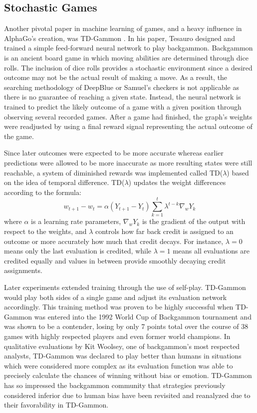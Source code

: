 

\subsection{Stochastic Games}


Another pivotal paper in machine learning of games,
and a heavy influence in AlphaGo's creation,
was TD-Gammon
\cite{tdgammon}.
%
In his paper,
Tesauro designed and trained a simple feed-forward neural network to play 
backgammon.
%
Backgammon is an ancient board game in which moving abilities are determined
through dice rolls.
%
The inclusion of dice rolls provides a stochastic environment since
a desired outcome may not be the actual result of making a move.
%
As a result,
the searching methodology of DeepBlue or Samuel's checkers is not applicable
as there is no guarantee of reaching a given state.
%
Instead,
the neural network is trained to predict the likely outcome of a game with a
given position
through observing several recorded games.
%
After a game had finished,
the graph's weights were readjusted by using a final reward signal representing
the actual outcome of the game.

Since later outcomes were expected to be more accurate whereas earlier
predictions were allowed to be more inaccurate as more resulting states were
still reachable,
a system of diminished rewards was implemented called
TD($\lambda$) based on the idea of temporal difference.
%
TD($\lambda$) updates the weight differences according to the formula:
\[
	w_{t+1} - w_t =
		\alpha (Y_{t+1}-Y_t)
		\sum_{k=1}^t {\lambda^{t-k} \nabla_w Y_k}
\]
where $\alpha$ is a learning rate parameters,
$\nabla_w Y_k$ is the gradient of the output with respect to the weights,
and $\lambda$ controls how far back credit is assigned to an outcome
or more accurately how much that credit decays.
%
For instance,
$\lambda=0$ means only the last evaluation is credited,
while $\lambda=1$ means all evaluations are credited equally
and values in between provide smoothly decaying credit assignments.

Later experiments extended training through the use of self-play.
%
TD-Gammon would play both sides of a single game and adjust its evaluation
network accordingly.
%
This training method was proven to be highly successful when TD-Gammon was
entered into the 1992 World Cup of Backgammon tournament and was shown to be a
contender,
losing by only 7 points total over the course of 38 games with highly respected
players and even former world champions.
%
In qualitative evaluations by Kit Woolsey,
one of backgammon's most respected analysts,
TD-Gammon was declared to play better than humans in situations which were
considered more complex as its evaluation function was able to precisely
calculate the chances of winning without bias or emotion.
%
TD-Gammon has so impressed the backgammon community that strategies previously
considered inferior due to human bias have been revisited and reanalyzed due to
their favorability in TD-Gammon.

